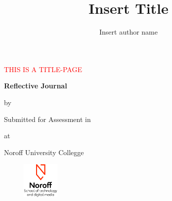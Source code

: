 \begin{titlepage}

  \begin{center}

    \textcolor{red}{\Huge{THIS IS A TITLE-PAGE}} %


      {\bfseries{\Huge{Reflective Journal}}}


      {\Large{by}}

    \begin{author}
      \author{\Large{Insert author name}}
    \end{author}


    \vspace*{2.5cm}
    Submitted for Assessment in


    \begin{title}
        \title{\bfseries{\huge{Insert Title}}}
    \end{title}

    \vspace*{2.5cm}
    at


    \Large{Noroff University Collegge}

    \vfill


    \begin{figure}[h!]
      \centering
      \includegraphics[height=50pt]{Noroff-Logo.png}
    \end{figure}


  \end{center}
\end{titlepage}
